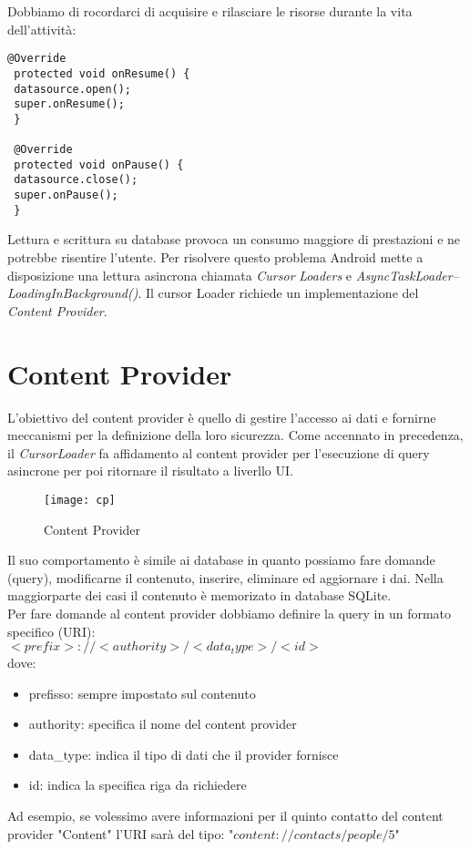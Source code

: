 Dobbiamo di rocordarci di acquisire e rilasciare le risorse durante la vita
dell'attività:
\begin{lstlisting}[frame=single]
@Override
 protected void onResume() {
 datasource.open();
 super.onResume();
 }

 @Override
 protected void onPause() {
 datasource.close();
 super.onPause();
 }
\end{lstlisting}
Lettura e scrittura su database provoca un consumo maggiore di prestazioni e ne
potrebbe risentire l'utente. Per risolvere questo problema Android mette a
disposizione una lettura asincrona chiamata \textit{Cursor} \textit{Loaders} e
\textit{AsyncTaskLoader}\textit{--}\textit{LoadingInBackground()}. Il cursor
Loader richiede un implementazione del \textit{Content Provider}.
\section{Content Provider}
L'obiettivo del content provider è quello di gestire l'accesso ai dati e
fornirne meccanismi per la definizione della loro sicurezza. Come accennato in
precedenza, il \textit{CursorLoader} fa affidamento al content provider per
l'esecuzione di query asincrone per poi ritornare il risultato a liverllo UI.
\begin{figure}
    \centering
    \texttt{[image: cp]}
    \caption{Content Provider}
    \label{fig:my_label}
\end{figure}
Il suo comportamento è simile ai database in quanto possiamo fare domande
(query), modificarne il contenuto, inserire, eliminare ed aggiornare i dai.
Nella maggiorparte dei casi il contenuto è memorizato in database SQLite. \\Per
fare domande al content provider dobbiamo definire la query in un formato
specifico (URI):\\$<prefix>://<authority>/<data_type>/<id>$\\
dove:
\begin{itemize}
    \item prefisso: sempre impostato sul contenuto
    \item authority: specifica il nome del content provider
    \item data\_type: indica il tipo di dati che il provider fornisce
    \item id: indica la specifica riga da richiedere
\end{itemize}
Ad esempio, se volessimo avere informazioni per il quinto contatto del content
provider "Content" l'URI sarà del tipo: "$content://contacts/people/5$"
